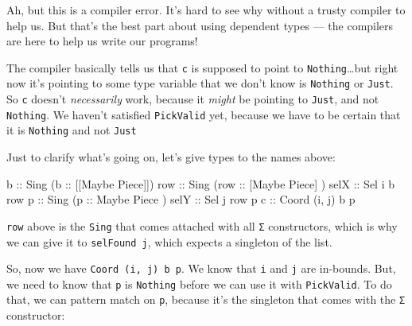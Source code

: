 \documentclass[]{article}
\newenvironment{Shaded}{}{}
\newcommand{\DataTypeTok}[1]{\textcolor[rgb]{0.56,0.13,0.00}{#1}}
\newcommand{\NormalTok}[1]{#1}
\newcommand{\OtherTok}[1]{\textcolor[rgb]{0.00,0.44,0.13}{#1}}
\begin{document}
Ah, but this is a compiler error. It's hard to see why without a trusty compiler
to help us. But that's the best part about using dependent types --- the
compilers are here to help us write our programs!

The compiler basically tells us that \texttt{c} is supposed to point to
\texttt{\textquotesingle{}Nothing}\ldots but right now it's pointing to some
type variable that we don't know is \texttt{\textquotesingle{}Nothing} or
\texttt{\textquotesingle{}Just}. So \texttt{c} doesn't \emph{necessarily} work,
because it \emph{might} be pointing to \texttt{\textquotesingle{}Just}, and not
\texttt{\textquotesingle{}Nothing}. We haven't satisfied \texttt{PickValid} yet,
because we have to be certain that it is \texttt{\textquotesingle{}Nothing} and
not \texttt{\textquotesingle{}Just}

Just to clarify what's going on, let's give types to the names above:

\begin{Shaded}
\begin{Highlighting}[]
\OtherTok{b    ::} \DataTypeTok{Sing}\NormalTok{ (}\OtherTok{b   ::}\NormalTok{ [[}\DataTypeTok{Maybe} \DataTypeTok{Piece}\NormalTok{]])}
\OtherTok{row  ::} \DataTypeTok{Sing}\NormalTok{ (}\OtherTok{row ::}\NormalTok{  [}\DataTypeTok{Maybe} \DataTypeTok{Piece}\NormalTok{] )}
\OtherTok{selX ::} \DataTypeTok{Sel}\NormalTok{ i b row}
\OtherTok{p    ::} \DataTypeTok{Sing}\NormalTok{ (}\OtherTok{p   ::}   \DataTypeTok{Maybe} \DataTypeTok{Piece}\NormalTok{  )}
\OtherTok{selY ::} \DataTypeTok{Sel}\NormalTok{ j row p}
\OtherTok{c    ::} \DataTypeTok{Coord}\NormalTok{ \textquotesingle{}(i, j) b p}
\end{Highlighting}
\end{Shaded}

\texttt{row} above is the \texttt{Sing} that comes attached with all \texttt{Σ}
constructors, which is why we can give it to \texttt{selFound\ j}, which expects
a singleton of the list.

So, now we have \texttt{Coord\ \textquotesingle{}(i,\ j)\ b\ p}. We know that
\texttt{i} and \texttt{j} are in-bounds. But, we need to know that \texttt{p} is
\texttt{\textquotesingle{}Nothing} before we can use it with \texttt{PickValid}.
To do that, we can pattern match on \texttt{p}, because it's the singleton that
comes with the \texttt{Σ} constructor:
\end{document}
